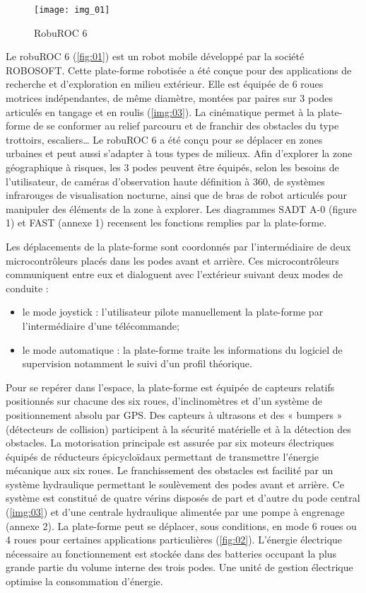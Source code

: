 \begin{wrapfigure}{r}{7cm}
\centering
\texttt{[image: img\_01]}
\caption{RobuROC 6 \label{fig:01}}
\end{wrapfigure}
Le robuROC 6 (\autoref{fig:01}) est un robot mobile développé par la société ROBOSOFT. Cette plate-forme robotisée a été conçue pour des applications de recherche et d’exploration en milieu extérieur. Elle est équipée de 6 roues motrices indépendantes, de même diamètre, montées par paires sur 3 podes articulés en tangage et en roulis (\autoref{img:03}). La cinématique permet à la plate-forme de se conformer au relief parcouru et de franchir des obstacles du type trottoirs, escaliers… Le robuROC 6 a été conçu pour se déplacer en zones urbaines et peut aussi s’adapter à tous types de milieux.  Afin d’explorer la zone géographique à risques, les 3 podes peuvent être équipés, selon les besoins de l’utilisateur, de caméras d’observation haute définition à 360\degres, de systèmes infrarouges de visualisation nocturne, ainsi que de bras de robot articulés pour manipuler des éléments de la zone à explorer. Les diagrammes SADT A-0 (figure 1) et FAST (annexe 1) recensent les fonctions remplies par la plate-forme.



Les déplacements de la plate-forme sont coordonnés par l’intermédiaire de deux microcontrôleurs placés dans les podes avant et arrière. Ces microcontrôleurs communiquent entre eux et dialoguent avec l’extérieur suivant deux modes de conduite : 
\begin{itemize}
\item le mode joystick : l’utilisateur pilote manuellement la plate-forme par l’intermédiaire d’une télécommande;
\item le mode automatique : la plate-forme traite les informations du logiciel de supervision notamment le suivi d’un profil théorique.
\end{itemize}

Pour se repérer dans l’espace, la plate-forme est équipée de capteurs relatifs positionnés sur chacune des six roues, d’inclinomètres et d’un système de positionnement absolu par GPS. Des capteurs à ultrasons et des « bumpers » (détecteurs de collision) participent à la sécurité matérielle et à la détection des obstacles.
La motorisation principale est assurée par six moteurs électriques équipés de réducteurs épicycloïdaux permettant de transmettre l’énergie mécanique aux six roues. Le franchissement des obstacles est facilité par un système hydraulique permettant le soulèvement des podes avant et arrière. Ce système est constitué de quatre vérins disposés de part et d’autre du pode central (\autoref{img:03}) et d’une centrale hydraulique alimentée par une pompe à engrenage (annexe 2). La plate-forme peut se déplacer, sous conditions, en mode 6 roues ou 4 roues pour certaines applications particulières (\autoref{fig:02}). L’énergie électrique nécessaire au fonctionnement est stockée dans des batteries occupant la plus grande partie du volume interne des trois podes. Une unité de gestion électrique optimise la consommation d’énergie. 

